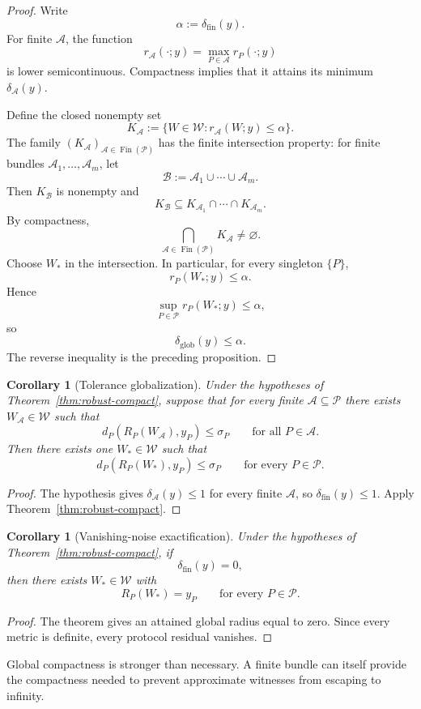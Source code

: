 \documentclass[11pt]{article}
\newtheorem{corollary}[definition]{Corollary}
\newcommand{\W}{\mathcal W}
\newcommand{\Pcal}{\mathcal P}
\newcommand{\Acal}{\mathcal A}
\newcommand{\Bcal}{\mathcal B}
\newcommand{\Fin}{\operatorname{Fin}}
\begin{document}
\begin{proof}
Write
\[
\alpha:=\delta_{\mathrm{fin}}(y).
\]
For finite $\Acal$, the function
\[
r_{\Acal}(\cdot;y)
=
\max_{P\in\Acal}r_P(\cdot;y)
\]
is lower semicontinuous. Compactness implies that it attains its minimum
$\delta_{\Acal}(y)$.

Define the closed nonempty set
\[
K_{\Acal}
:=
\{W\in\W:r_{\Acal}(W;y)\le\alpha\}.
\]
The family $(K_{\Acal})_{\Acal\in\Fin(\Pcal)}$ has the finite intersection
property: for finite bundles $\Acal_1,\ldots,\Acal_m$, let
\[
\Bcal:=\Acal_1\cup\cdots\cup\Acal_m.
\]
Then $K_{\Bcal}$ is nonempty and
\[
K_{\Bcal}\subseteq
K_{\Acal_1}\cap\cdots\cap K_{\Acal_m}.
\]
By compactness,
\[
\bigcap_{\Acal\in\Fin(\Pcal)}K_{\Acal}\neq\varnothing.
\]
Choose $W_\ast$ in the intersection. In particular, for every singleton
$\{P\}$,
\[
r_P(W_\ast;y)\le\alpha.
\]
Hence
\[
\sup_{P\in\Pcal}r_P(W_\ast;y)\le\alpha,
\]
so
\[
\delta_{\mathrm{glob}}(y)\le\alpha.
\]
The reverse inequality is the preceding proposition.
\end{proof}

\begin{corollary}[Tolerance globalization]
Under the hypotheses of Theorem~\ref{thm:robust-compact}, suppose that for
every finite $\Acal\subseteq\Pcal$ there exists $W_{\Acal}\in\W$ such that
\[
d_P(R_P(W_{\Acal}),y_P)\le\sigma_P
\qquad
\text{for all }P\in\Acal.
\]
Then there exists one $W_\ast\in\W$ such that
\[
d_P(R_P(W_\ast),y_P)\le\sigma_P
\qquad
\text{for every }P\in\Pcal.
\]
\end{corollary}

\begin{proof}
The hypothesis gives $\delta_{\Acal}(y)\le1$ for every finite $\Acal$, so
$\delta_{\mathrm{fin}}(y)\le1$. Apply
Theorem~\ref{thm:robust-compact}.
\end{proof}

\begin{corollary}[Vanishing-noise exactification]
Under the hypotheses of Theorem~\ref{thm:robust-compact}, if
\[
\delta_{\mathrm{fin}}(y)=0,
\]
then there exists $W_\ast\in\W$ with
\[
R_P(W_\ast)=y_P
\qquad
\text{for every }P\in\Pcal.
\]
\end{corollary}

\begin{proof}
The theorem gives an attained global radius equal to zero. Since every metric
is definite, every protocol residual vanishes.
\end{proof}

Global compactness is stronger than necessary. A finite bundle can itself
provide the compactness needed to prevent approximate witnesses from escaping
to infinity.
\end{document}
